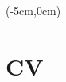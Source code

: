 \newpage
\setlength{\parskip}{0.25em}
\renewcommand*{\thefootnote}{\fnsymbol{footnote}}
\setcounter{footnote}{0}
\newcommand*{\cventrynocomma}[7][.25em]{%
	\cvitem[#1]{#2}{%
		{\bfseries#3}%
		\ifthenelse{\equal{#4}{}}{}{ {#4}}%
		\ifthenelse{\equal{#5}{}}{}{ \newline\small #5 \normalfont}%
		\ifthenelse{\equal{#6}{}}{}{ #6}%
		\strut%
		\ifx&#7&%
		\else{\newline{}\begin{minipage}[t]{\linewidth}\small#7\end{minipage}}\fi}}







\begin{textblock*}{21cm}(-5cm,0cm)	
	\section{CV}
\end{textblock*}

